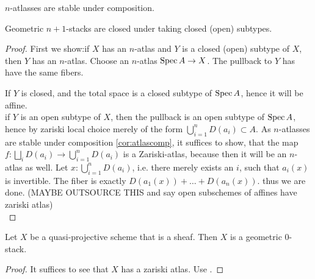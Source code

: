 \documentclass{article}
\begin{document}
\begin{corollary}{\label{cor:atlascomp}}
    $n$-atlasses are stable under composition.
\end{corollary}
\begin{lemma}
Geometric $n+1$-stacks are closed under taking closed (open) subtypes.
\end{lemma}
\begin{proof}
First we show:if $X$ has an $n$-atlas and $Y$ is a closed (open) subtype of $X$, then $Y$ has an $n$-atlas. %
    Choose an $n$-atlas $\operatorname{Spec} A \to X$. The pullback to $Y$ has have the same fibers.
    
    If $Y$ is closed,  and the total space is a closed subtype of $\operatorname{Spec} A$, hence it will be affine. \\
    if $Y$ is an open subtype of $X$, then the pullback is an open subtype of $\operatorname{Spec} A$, hence by zariski local choice merely of the form $\bigcup_{i=1}^n D(a_i) \subset A$. 
    As $n$-atlasses are stable under composition \ref{cor:atlascomp}, it suffices to show, that the map $f : \bigsqcup_i D(a_i) \to \bigcup_{i=1}^n D(a_i)$ is a Zariski-atlas, because then it will be an $n$-atlas as well. Let $x : \bigcup_{i=1}^n D(a_i)$, i.e. there merely exists an $i$, such that $a_i(x)$ is invertible. The fiber is exactly $D(a_1(x)) + \hdots + D(a_n(x))$. thus we are done. (MAYBE OUTSOURCE THIS and say open subschemes of affines have zariski atlas)\\
    \end{proof}
\begin{corollary}
    Let $X$ be a quasi-projective scheme that is a sheaf. Then $X$ is a geometric 0-stack. 
\end{corollary}   
\begin{proof}
    It suffices to see that $X$ has a zariski atlas. Use \label{ex:PnIsStack}.
\end{proof}
\end{document}
